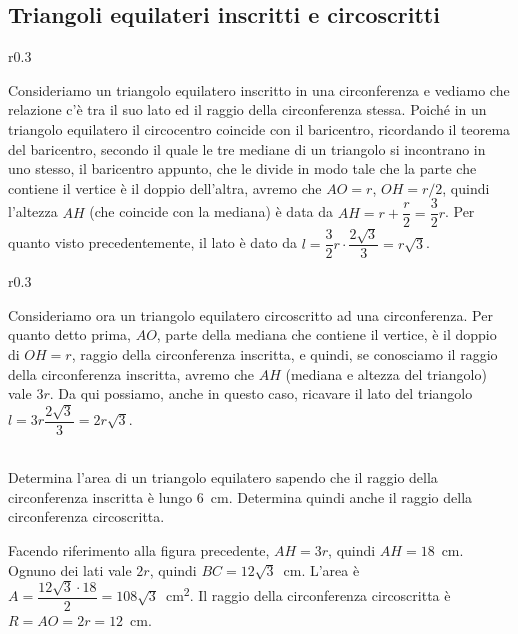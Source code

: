 \pagebreak
\subsection{Triangoli equilateri inscritti e circoscritti}

\setlength{\intextsep}{3pt plus 2.0pt minus 2.0pt}
\begin{wrapfigure}{r}{0.3\textwidth}
	\centering
\end{wrapfigure}
Consideriamo un triangolo equilatero inscritto in una circonferenza e vediamo che relazione c'è tra il suo lato ed il raggio della circonferenza stessa.
Poiché in un triangolo equilatero il circocentro coincide con il baricentro, ricordando il teorema del baricentro, secondo il quale le tre mediane di un triangolo si incontrano in uno stesso, il baricentro appunto, che le divide in modo tale che la parte che contiene il vertice è il doppio dell'altra, avremo che $AO = r$, $OH = r/2$, quindi l'altezza $AH$ (che coincide con la mediana) è data da $AH = r+\dfrac{r}{2}=\dfrac{3}{2}r$.
Per quanto visto precedentemente, il lato è dato da $l=\dfrac{3}{2}r\cdot\dfrac{2\sqrt{3}}{3}=r\sqrt{3}$. 

\begin{wrapfigure}{r}{0.3\textwidth}
	\centering
\end{wrapfigure}
Consideriamo ora un triangolo equilatero circoscritto ad una circonferenza.
Per quanto detto prima, $AO$, parte della mediana che contiene il vertice, è il doppio di $OH = r$, raggio della circonferenza inscritta, e quindi, se conosciamo il raggio della circonferenza inscritta, avremo che $AH$ (mediana e altezza del triangolo) vale $3r$. Da qui possiamo, anche in questo caso, ricavare il lato del triangolo $l=3r\dfrac{2\sqrt{3}}{3}=2r\sqrt{3}$.\\
~\\

\begin{exrig}
\begin{esempio}
Determina l'area di un triangolo equilatero sapendo che il raggio della circonferenza inscritta è lungo 6~cm. Determina quindi anche il raggio della circonferenza circoscritta.\vspace{7pt}

Facendo riferimento alla figura precedente, $AH=3r$, quindi $AH = 18$~cm. 
Ognuno dei lati vale $2r$, quindi $BC = 12\sqrt{3}$~cm.
L'area è $A = \dfrac{12\sqrt{3}\cdot 18}{2} = 108\sqrt{3}$~cm\textsuperscript{2}.
Il raggio della circonferenza circoscritta è $R= AO = 2r = 12$~cm.
\end{esempio}
\end{exrig}

